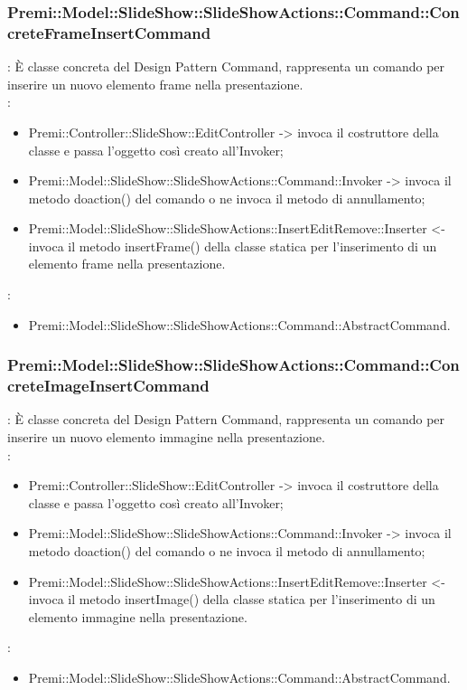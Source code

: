 {                    \subsubsection{Premi::Model::SlideShow::SlideShowActions::Command::ConcreteFrameInsertCommand}{
				\textbf{\tipo}: È classe concreta del Design Pattern Command, rappresenta un comando per inserire un nuovo elemento frame nella presentazione.\\	
				\textbf{\relaz}: 
				\begin{itemize}
					\item Premi::Controller::SlideShow::EditController -> invoca il costruttore della classe e passa l’oggetto così creato all’Invoker;
					\item Premi::Model::SlideShow::SlideShowActions::Command::Invoker -> invoca il metodo doaction() del comando o ne invoca il metodo di annullamento;
                    \item Premi::Model::SlideShow::SlideShowActions::InsertEditRemove::Inserter <- invoca il metodo insertFrame() della classe statica per l’inserimento di un elemento frame nella presentazione.
				\end{itemize}	
                \textbf{\base}: 
                    \begin{itemize}
                    \item Premi::Model::SlideShow::SlideShowActions::Command::AbstractCommand.
                    \end{itemize}
                    }
                    \subsubsection{Premi::Model::SlideShow::SlideShowActions::Command::ConcreteImageInsertCommand}{
				\textbf{\tipo}: È classe concreta del Design Pattern Command, rappresenta un comando per inserire un nuovo elemento immagine nella presentazione.\\	
				\textbf{\relaz}: 
				\begin{itemize}
					\item Premi::Controller::SlideShow::EditController -> invoca il costruttore della classe e passa l’oggetto così creato all’Invoker;
					\item Premi::Model::SlideShow::SlideShowActions::Command::Invoker -> invoca il metodo doaction() del comando o ne invoca il metodo di annullamento;
                    \item Premi::Model::SlideShow::SlideShowActions::InsertEditRemove::Inserter <- invoca il metodo insertImage() della classe statica per l’inserimento di un elemento immagine nella presentazione.
				\end{itemize}	
                \textbf{\base}: 
                    \begin{itemize}
                    \item Premi::Model::SlideShow::SlideShowActions::Command::AbstractCommand.
                    \end{itemize}
                    }
}
